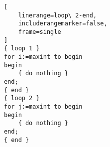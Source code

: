 \documentclass[10pt,a4paper]{article}
\begin{document}

\begin{lstlisting}[
	linerange=loop\ 2-end,
	includerangemarker=false,
	frame=single
]
{ loop 1 }
for i:=maxint to begin
begin
    { do nothing }
end;
{ end }
{ loop 2 }
for j:=maxint to begin
begin
    { do nothing }
end;
{ end }
\end{lstlisting}
\end{document}

